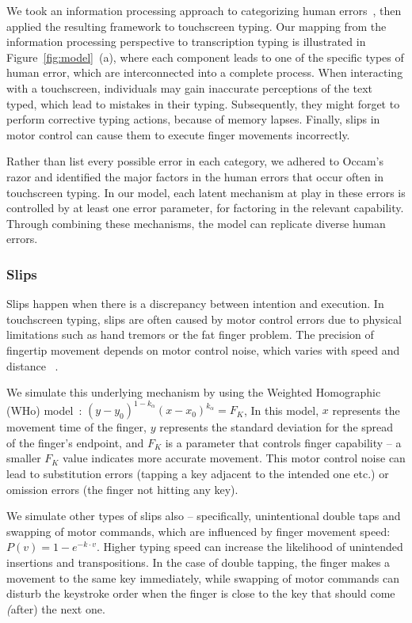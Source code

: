 We took an information processing approach to categorizing human errors~\cite{wickens2021engineering}, then applied the resulting framework to touchscreen typing. 
Our mapping from the information processing perspective to transcription typing is illustrated in Figure~\ref{fig:model}~(a), where each component leads to one of the specific types of human error, which are interconnected into a complete process. 
%
When interacting with a touchscreen, individuals may gain inaccurate perceptions of the text typed, which lead to mistakes in their typing. Subsequently, they might forget to perform corrective typing actions, because of memory lapses. Finally, slips in motor control can cause them to execute finger movements incorrectly. 

Rather than list every possible error in each category, we adhered to Occam's razor and identified the major factors in the human errors that occur often in touchscreen typing. In our model, each latent mechanism at play in these errors is controlled by at least one error parameter, for factoring in the relevant capability. Through combining these mechanisms, the model can replicate diverse human errors.

\subsubsection{Slips}

Slips happen when there is a discrepancy between intention and execution. In touchscreen typing, slips are often caused by motor control errors due to physical limitations such as hand tremors or the fat finger problem.
The precision of fingertip movement depends on motor control noise, which varies with speed and distance ~\cite{fitts1954information}.

We simulate this underlying mechanism by using the Weighted Homographic (WHo) model~\cite{guiard2015mathematical}: $(y-y_0)^{1-k_\alpha}(x-x_0)^{k_\alpha} = F_K$,
In this model, $x$ represents the movement time of the finger, $y$ represents the standard deviation for the spread of the finger's endpoint, and $F_K$ is a parameter that controls finger capability – a smaller $F_K$ value indicates more accurate movement. This motor control noise can lead to substitution errors (tapping a key adjacent to the intended one etc.) or omission errors (the finger not hitting any key). 

We simulate other types of slips also -- specifically, unintentional double taps and swapping of motor commands, which are influenced by finger movement speed: $P(v)=1 - e^{-k \cdot v}$. Higher typing speed can increase the likelihood of unintended insertions and transpositions.
In the case of double tapping, the finger makes a movement to the same key immediately, while swapping of motor commands can disturb the keystroke order when the finger is close to the key that should come \emph(after) the next one.

